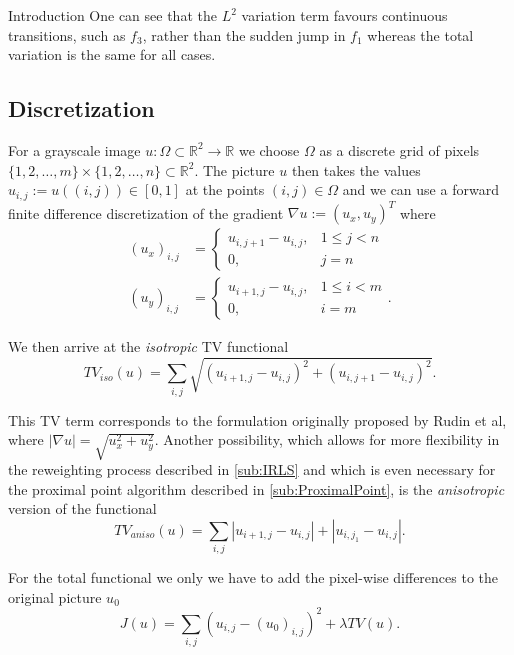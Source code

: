 \begin{chapter}{Introduction}
One can see that the $L^2$ variation term favours continuous transitions, such as $f_3$, rather than the sudden jump in $f_1$ whereas the total variation is the same for
all cases.


\subsection{Discretization} %
\label{sub:Discretization}
For a grayscale image $u:\Omega\subset\mathbb{R}^2\to\mathbb{R}$ we choose $\Omega$ as a discrete grid of pixels 
$\lbrace 1,2,\ldots,m\rbrace\times\lbrace1,2,\ldots,n\rbrace\subset\mathbb{R}^2$. The picture $u$ then takes the values $u_{i,j}:=u((i,j))\in [0,1]$
at the points $(i,j)\in\Omega$ and we can use a forward finite difference discretization of the gradient $\nabla u:=(u_x,u_y)^T$ where
\begin{align}
    (u_x)_{i,j} &= 
	\begin{cases}
	u_{i,j+1}-u_{i,j}, & 1\leq j < n \\
	0, & j=n 
	\end{cases} \\
    (u_y)_{i,j} &= 
	\begin{cases}
	u_{i+1,j}-u_{i,j}, & 1\leq i < m \\
	0, &i=m
	\end{cases}.\nonumber
\end{align}

We then arrive at the \emph{isotropic} TV functional
\begin{equation}
    \label{eq:original_isofunctional}
    TV_{iso}(u)=\sum_{i,j}\sqrt{(u_{i+1,j}-u_{i,j})^{2}+(u_{i,j+1}-u_{i,j})^{2}}.
\end{equation}

This TV term corresponds to the formulation originally proposed by Rudin et al\cite{RudinOsher}, where $\left\vert\nabla u\right\vert=\sqrt{u_x^{2}+u_y^{2} }$.
Another possibility, which allows for more flexibility in the reweighting process described in \ref{sub:IRLS} and which is even necessary
for the proximal point algorithm described in \ref{sub:ProximalPoint}, is the \emph{anisotropic} version of the functional
\begin{equation}
    \label{eq:original_anisofunctional}
    TV_{aniso}(u)=\sum_{i,j}|u_{i+1,j}-u_{i,j}|+|u_{i,j_1}-u_{i,j}|.
\end{equation}

For the total functional we only we have to add the pixel-wise differences to the original picture $u_0$
\begin{equation}
    \label{eq:original_functional}
    J(u)=\sum_{i,j}(u_{i,j}-(u_0)_{i,j})^2 + \lambda TV(u).
\end{equation}



\end{chapter}
